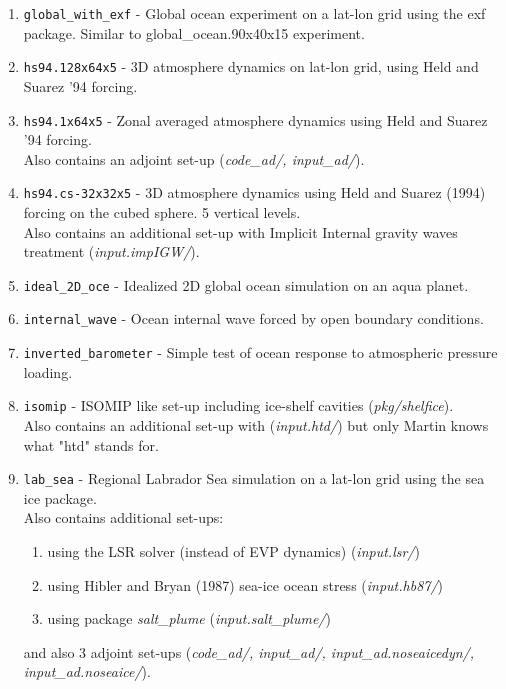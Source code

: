 \begin{enumerate}
\item \texttt{global\_with\_exf} - Global ocean experiment on a lat-lon
  grid using the exf package. Similar to global\_ocean.90x40x15
  experiment.

\item \texttt{hs94.128x64x5} - 3D atmosphere dynamics on lat-lon grid,
  using Held and Suarez '94 forcing.
  
\item \texttt{hs94.1x64x5} - Zonal averaged atmosphere dynamics 
  using Held and Suarez '94 forcing.\\
  Also contains an adjoint set-up ({\it code\_ad/, input\_ad/}).
  
\item \texttt{hs94.cs-32x32x5} - 3D atmosphere dynamics using Held and
  Suarez (1994) forcing on the cubed sphere. 5 vertical levels.\\
  Also contains an additional set-up with Implicit Internal gravity waves
  treatment ({\it input.impIGW/}).

\item \texttt{ideal\_2D\_oce} - Idealized 2D global ocean simulation on
  an aqua planet.

\item \texttt{internal\_wave} - Ocean internal wave forced by open
  boundary conditions.

\item \texttt{inverted\_barometer} - Simple test of ocean response to
  atmospheric pressure loading.

\item \texttt{isomip} - ISOMIP like set-up including ice-shelf cavities
  ({\it pkg/shelfice}).\\
  Also contains an additional set-up with ({\it input.htd/})
  but only Martin knows what "htd" stands for.

\item \texttt{lab\_sea} - Regional Labrador Sea simulation on a lat-lon
  grid using the sea ice package.\\
  Also contains additional set-ups:
  \begin{enumerate}
   \item using the LSR solver (instead of EVP dynamics) ({\it input.lsr/})
   \item using Hibler and Bryan (1987) sea-ice ocean stress ({\it input.hb87/})
   \item using package {\it salt\_plume} ({\it input.salt\_plume/})
  \end{enumerate}
  and also 3 adjoint set-ups ({\it code\_ad/, input\_ad/, input\_ad.noseaicedyn/,
  input\_ad.noseaice/}).


\end{enumerate}
